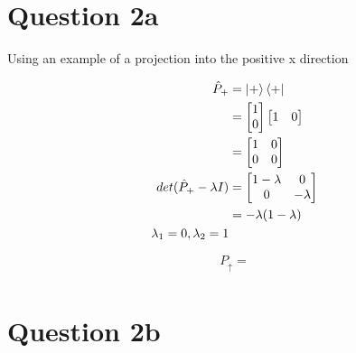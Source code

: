 \documentclass{article}
\begin{document}
\section*{Question 2a}
\begin{paragraph}
    Using an example of a projection into the positive x direction\mathsf{}
\end{paragraph}
\begin{align*}
    \begin{split}
        \hat{P}_+ &= \ket{+}\bra{+} \\
        &= \begin{bmatrix} 1 \\ 0 \end{bmatrix}  \begin{bmatrix} 1 & 0 \end{bmatrix} \\
        &= \begin{bmatrix} 
            1 & 0 \\ 
            0 & 0
        \end{bmatrix} \\
        det(\hat{P}_+ - \lambda I) &= \begin{bmatrix}
            1 - \lambda & 0 \\
            0 & -\lambda
        \end{bmatrix} \\
        &= -\lambda (1 - \lambda) \\
        \lambda_1 = 0, \lambda_2 = 1
    \end{split}
\end{align*}
\begin{align*}
    \begin{split}
        P_\uparrow =    
    \end{split}
\end{align*}
\section*{Question 2b}
\end{document}
